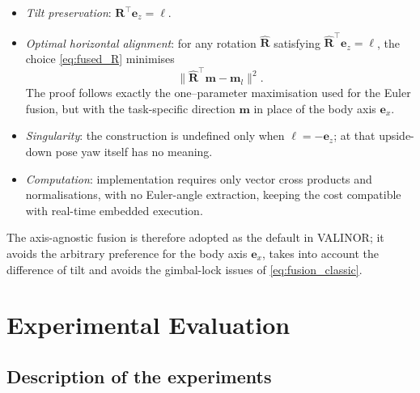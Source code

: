 \documentclass{IJCAS}
\begin{document}
\begin{itemize}
  \item \emph{Tilt preservation}:  
        \(\boldsymbol{R}^{\top}\boldsymbol{e}_{z}=\boldsymbol{\ell}\).

  \item \emph{Optimal horizontal alignment}:  
        for any rotation \(\hat{\boldsymbol{R}}\) satisfying
        \(\hat{\boldsymbol{R}}^{\top}\boldsymbol{e}_{z}=\boldsymbol{\ell}\),
        the choice \eqref{eq:fused_R} minimises
        \[
          \bigl\|
             \hat{\boldsymbol{R}}^{\top}\boldsymbol{m}-\boldsymbol{m}_{l}
          \bigr\|^{2}.
        \]
        The proof follows exactly the one–parameter maximisation used
        for the Euler fusion, but with the task-specific direction
        \(\boldsymbol{m}\) in place of the body axis
        \(\boldsymbol{e}_{x}\).

  \item \emph{Singularity}:  
        the construction is undefined only when
        \(\boldsymbol{\ell}=-\boldsymbol{e}_{z}\); at that upside-down
        pose yaw itself has no meaning.

  \item \emph{Computation}:  
        implementation requires only vector cross products and
        normalisations, with no Euler-angle extraction, keeping the cost
        compatible with real-time embedded execution.
\end{itemize}

The axis-agnostic fusion is therefore adopted as the default in \textsc{VALINOR}; it avoids the arbitrary preference for the body axis \(\boldsymbol{e}_{x}\), takes into account the difference of tilt and avoids the gimbal-lock issues of \eqref{eq:fusion_classic}. 





\section{Experimental Evaluation}
\subsection{Description of the experiments}
\end{document}
